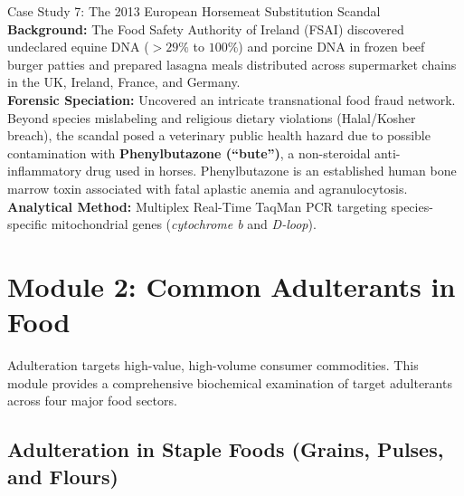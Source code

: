 \documentclass[11pt,a4paper,oneside]{article}
\begin{document}
\begin{casestudybox}{Case Study 7: The 2013 European Horsemeat Substitution Scandal}
\textbf{Background:} The Food Safety Authority of Ireland (FSAI) discovered undeclared equine DNA ($>29\%$ to $100\%$) and porcine DNA in frozen beef burger patties and prepared lasagna meals distributed across supermarket chains in the UK, Ireland, France, and Germany.\\
\textbf{Forensic Speciation:} Uncovered an intricate transnational food fraud network. Beyond species mislabeling and religious dietary violations (Halal/Kosher breach), the scandal posed a veterinary public health hazard due to possible contamination with \textbf{Phenylbutazone (``bute'')}, a non-steroidal anti-inflammatory drug used in horses. Phenylbutazone is an established human bone marrow toxin associated with fatal aplastic anemia and agranulocytosis.\\
\textbf{Analytical Method:} Multiplex Real-Time TaqMan PCR targeting species-specific mitochondrial genes (\textit{cytochrome b} and \textit{D-loop}).
\end{casestudybox}

\newpage

\section{Module 2: Common Adulterants in Food}

Adulteration targets high-value, high-volume consumer commodities. This module provides a comprehensive biochemical examination of target adulterants across four major food sectors.

\subsection{Adulteration in Staple Foods (Grains, Pulses, and Flours)}
\end{document}
